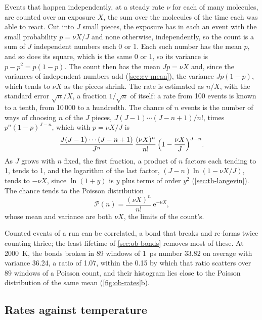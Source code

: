 \begin{toolbox}
Events that happen independently, at a steady rate $\nu$ for each of
many molecules, are counted over an exposure $X$, the sum over the
molecules of the time each was able to react. Cut into $J$ small pieces,
the exposure has in each an event with the small probability $p = \nu
X/J$ and none otherwise, independently, so the count is a sum of $J$
independent numbers each 0 or 1. Each such number has the mean $p$, and
so does its square, which is the same 0 or 1, so its variance is $p -
p^2 = p(1 - p)$. The count then has the mean $Jp = \nu X$ and, since the
variances of independent numbers add (\cref{sec:cv-mean}), the variance
$Jp(1 - p)$, which tends to $\nu X$ as the pieces shrink. The rate is
estimated as $n/X$, with the standard error $\sqrt n/X$, a fraction
$1/\sqrt n$ of itself: a rate from 100 events is known to a tenth, from
10\,000 to a hundredth. The chance of $n$ events is the number of ways of
choosing $n$ of the $J$ pieces, $J(J - 1)\cdots(J - n + 1)/n!$, times
$p^n(1 - p)^{J - n}$, which with $p = \nu X/J$ is
\begin{equation*}
   \frac{J(J - 1)\cdots(J - n + 1)}{J^n}\,\frac{(\nu X)^n}{n!}\,
   \Bigl(1 - \frac{\nu X}{J}\Bigr)^{J - n} .
\end{equation*}
As $J$ grows with $n$ fixed, the first fraction, a product of $n$
factors each tending to 1, tends to 1, and the logarithm of the last
factor, $(J - n)\ln(1 - \nu X/J)$, tends to $-\nu X$, since $\ln(1 + y)$
is $y$ plus terms of order $y^2$ (\cref{sec:th-langevin}). The chance
tends to the Poisson distribution
\begin{equation*}
   \mathcal{P}(n) = \frac{(\nu X)^n}{n!}\,\mathrm{e}^{-\nu X} ,
\end{equation*}
whose mean and variance are both $\nu X$, the limits of the count's.
\end{toolbox}

\noindent Counted events of a run can be correlated, a bond that breaks
and re-forms twice counting thrice; the least lifetime of
\cref{sec:ob-bonds} removes most of these. At \SI{2000}{\kelvin}, the bonds
broken in 89 windows of \SI{1}{\pico\second} number 33.82 on average with
variance 36.24, a ratio of 1.07, within the 0.15 by which that ratio
scatters over 89 windows of a Poisson count, and their histogram lies
close to the Poisson distribution of the same mean
(\cref{fig:ob-rates}b).

\subsection*{Rates against temperature}

